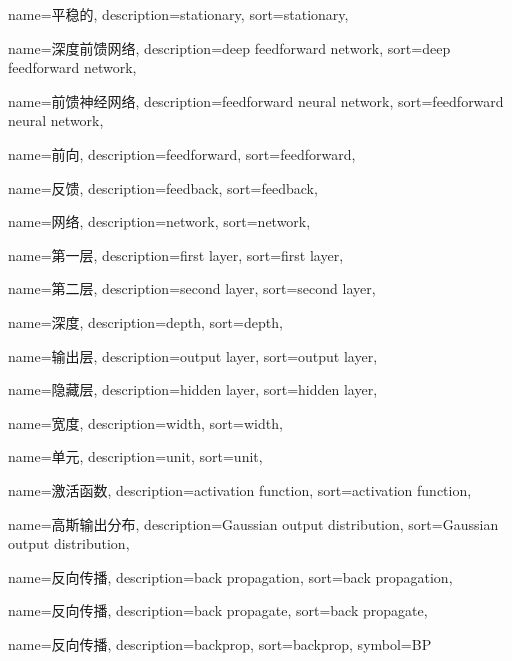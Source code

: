 {
  name=平稳的,
  description={stationary},
  sort={stationary},
}

{
  name=深度前馈网络,
  description={deep feedforward network},
  sort={deep feedforward network},
}

{
  name=前馈神经网络,
  description={feedforward neural network},
  sort={feedforward neural network},
}

{
  name=前向,
  description={feedforward},
  sort={feedforward},
}

{
  name=反馈,
  description={feedback},
  sort={feedback},
}

{
  name=网络,
  description={network},
  sort={network},
}

{
  name=第一层,
  description={first layer},
  sort={first layer},
}

{
  name=第二层,
  description={second layer},
  sort={second layer},
}

{
  name=深度,
  description={depth},
  sort={depth},
}

{
  name=输出层,
  description={output layer},
  sort={output layer},
}

{
  name=隐藏层,
  description={hidden layer},
  sort={hidden layer},
}

{
  name=宽度,
  description={width},
  sort={width},
}

{
  name=单元,
  description={unit},
  sort={unit},
}

{
  name=激活函数,
  description={activation function},
  sort={activation function},
}

{
  name=高斯输出分布,
  description={Gaussian output distribution},
  sort={Gaussian output distribution},
}

{
  name=反向传播,
  description={back propagation},
  sort={back propagation},
}

{
  name=反向传播,
  description={back propagate},
  sort={back propagate},
}

{
  name=反向传播,
  description={backprop},
  sort={backprop},
  symbol={BP}
}

